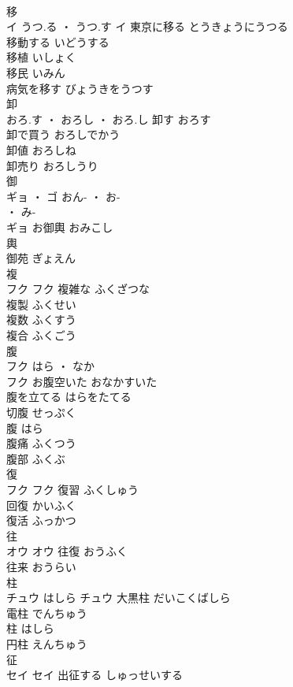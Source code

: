\documentclass[8pt]{extreport}
\begin{document}
\begin{CJK}{UTF8}{min}
\\	移	
\\	イ	うつ.る ・ うつ.す	イ	東京に移る	とうきょうにうつる	
\\	移動する	いどうする	
\\	移植	いしょく	
\\	移民	いみん	
\\	病気を移す	びょうきをうつす	
\\	卸	
\\	おろ.す ・ おろし ・ おろ.し		卸す	おろす	
\\	卸で買う	おろしでかう	
\\	卸値	おろしね	
\\	卸売り	おろしうり	
\\	御	
\\	ギョ ・ ゴ	おん- ・ お-
\\	・ み-
\\	ギョ													お御輿	おみこし	
\\	輿 
\\	御苑	ぎょえん	
\\	複	
\\	フク		フク	複雑な	ふくざつな	
\\	複製	ふくせい	
\\	複数	ふくすう	
\\	複合	ふくごう	
\\	腹	
\\	フク	はら ・ なか
\\	フク	お腹空いた	おなかすいた	
\\	腹を立てる	はらをたてる	
\\	切腹	せっぷく	
\\	腹	はら	
\\	腹痛	ふくつう	
\\	腹部	ふくぶ	
\\	復	
\\	フク		フク	復習	ふくしゅう	
\\	回復	かいふく	
\\	復活	ふっかつ	
\\	往	
\\	オウ		オウ	往復	おうふく	
\\	往来	おうらい	
\\	柱	
\\	チュウ	はしら	チュウ	大黒柱	だいこくばしら	
\\	電柱	でんちゅう	
\\	柱	はしら	
\\	円柱	えんちゅう	
\\	征	
\\	セイ		セイ	出征する	しゅっせいする	

\end{CJK}
\end{document}
